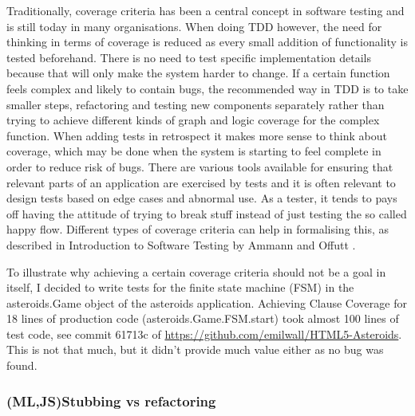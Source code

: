 \documentclass[11pt]{article}
\begin{document}
Traditionally, coverage criteria has been a central concept in software testing and is still today in many organisations. When doing TDD however, the need for thinking in terms of coverage is reduced as every small addition of functionality is tested beforehand. There is no need to test specific implementation details because that will only make the system harder to change. If a certain function feels complex and likely to contain bugs, the recommended way in TDD is to take smaller steps, refactoring and testing new components separately rather than trying to achieve different kinds of graph and logic coverage for the complex function. When adding tests in retrospect it makes more sense to think about coverage, which may be done when the system is starting to feel complete in order to reduce risk of bugs. There are various tools available for ensuring that relevant parts of an application are exercised by tests and it is often relevant to design tests based on edge cases and abnormal use. As a tester, it tends to pays off having the attitude of trying to break stuff instead of just testing the so called happy flow. Different types of coverage criteria can help in formalising this, as described in Introduction to Software Testing by Ammann and Offutt \cite{AmmannOffutt}. %
\label{subsec:coveragecriteria}

To illustrate why achieving a certain coverage criteria should not be a goal in itself, I decided to write tests for the finite state machine (FSM) in the asteroids.Game object of the asteroids application. Achieving Clause Coverage\cite[p.~106]{AmmannOffutt} for 18 lines of production code (asteroids.Game.FSM.start) took almost 100 lines of test code, see commit 61713c of \url{https://github.com/emilwall/HTML5-Asteroids}. This is not that much, but it didn't provide much value either as no bug was found.

\subsubsection{(ML,JS)Stubbing vs refactoring}
\end{document}
